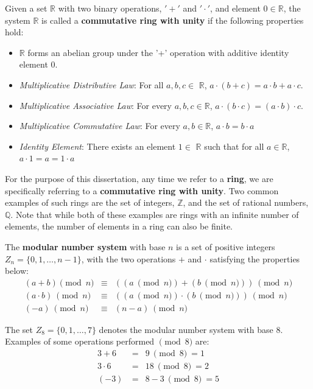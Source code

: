 \begin{Definition}
Given a set $\mathbb{R}$ with two binary operations, $'+'$ and $'\cdot'$, 
and element $0 \in \mathbb{R}$, the system $\mathbb{R}$ is called a {\bf commutative ring with unity} if the following properties hold:
\begin{itemize}
\item $\mathbb{R}$ forms an abelian group under the '+' operation with additive identity element $0$.
\item {\it Multiplicative Distributive Law}: For all $a, b, c \in$ $\mathbb{R}$, $a\cdot (b + c) = a\cdot b + a\cdot c$.
\item {\it Multiplicative Associative Law}: For every $a, b, c\in \mathbb{R}$, $a\cdot (b\cdot c) = (a\cdot b)\cdot c$. 
\item {\it Multiplicative Commutative Law}: For every $a,b \in \mathbb{R}$, $a\cdot b = b\cdot a$
\item {\it Identity Element}: There exists an element $1 \in$ $\mathbb{R}$ 
such that for all $a \in \mathbb{R}$, $a\cdot 1 = a =1\cdot a$
\end{itemize}
\end{Definition}

For the purpose of this dissertation, any time we refer to a {\bf ring}, we are 
specifically referring to a {\bf commutative ring with unity}. Two common 
examples of such rings are the set of integers, $\mathbb{Z}$, and the set of 
rational numbers, $\mathbb{Q}$. Note that while both of these examples are
rings with an infinite number of elements, the number of elements in a ring 
can also be finite.

\begin{Definition}
The {\bf modular number system} with base $n$ is a set of positive
integers $Z_n = \{0, 1, \ldots, n-1\}$, with the two operations $+$
and $\cdot$ satisfying the properties below:
\begin{eqnarray}
(a + b)\pmod{ n } &\equiv& ((a ~\pmod {n}) + (b ~\pmod {n})) ~\pmod {n} \nonumber\\
(a\cdot b) ~\pmod {n} &\equiv& ((a ~\pmod {n}) \cdot (b ~\pmod {n})) ~\pmod {n} \label{eq:modmult}\nonumber\\
(-a) ~\pmod {n} &\equiv& (n-a) ~\pmod {n}\nonumber 
\end{eqnarray}
\end{Definition}


\begin{Example}
The set $Z_8 = \{0, 1, \ldots, 7\}$ denotes the modular number system
with base $8$. Examples of some operations performed $\pmod {8}$
are:
\begin{eqnarray} \nonumber
        3 + 6   &~=& 9  ~\pmod{8} ~= 1 \nonumber \\
        3 \cdot 6   &~=& 18 ~\pmod{8} ~= 2 \nonumber \\
        (-3)    &~=& 8-3  ~\pmod{8} ~= 5 \nonumber
\end{eqnarray} \nonumber
\end{Example}

